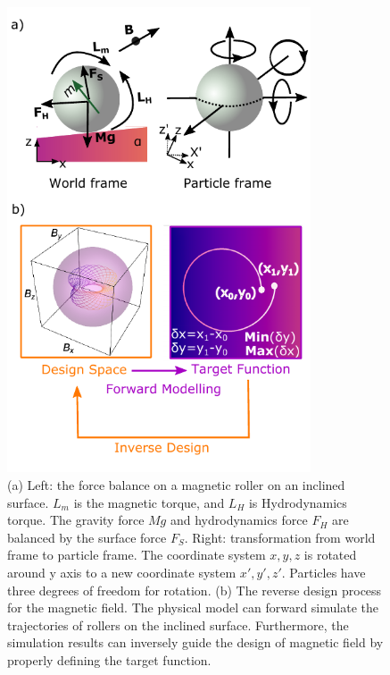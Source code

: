 \begin{figure}[p]
\centering
\includegraphics[width=9cm]{figures/5_2.pdf}
\caption{ (a) Left: the force balance on a magnetic roller on an inclined surface. $L_m$ is the magnetic torque, and $L_H$ is Hydrodynamics torque. The gravity force $Mg$ and hydrodynamics force $F_H$ are balanced by the surface force $F_S$.   Right: transformation from world frame to particle frame. The coordinate system $x,y,z$ is rotated around y axis to a new coordinate system $x',y',z'$. Particles have three degrees of freedom for rotation. (b) The reverse design process for the magnetic field. The physical model can forward simulate the trajectories of rollers on the inclined surface. Furthermore, the simulation results can inversely guide the design of magnetic field by properly defining the target function.}
\label{fig:5.2}
\end{figure}
